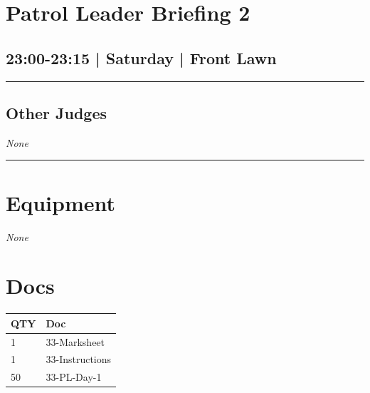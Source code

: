 \documentclass[10pt, A5]{article}
\begin{document}
        \begin{framed}
        \begin{minipage}{\textwidth}

        \setcounter{section}{52}
        \section{Patrol Leader Briefing 2}
        \subsection*{23:00-23:15 | Saturday | Front Lawn}

        \vspace{0.25cm}
        \hrule
        \vspace{0.25cm}


        \subsection*{Other Judges}
                \textit{None}

            \vspace{0.25cm}
        \hrule
        \vspace{0.25cm}

        \begin{multicols}{2}

		\section*{\faWrench \: Equipment}

				\textit{None}
		
		\vfill\null
		\columnbreak

			\section*{\faFile \: Docs}
		 	\begin{center}
			\begin{tabular}{p{2cm}p{4cm}}

			\textbf{QTY} & \textbf{Doc} \\\toprule
										1&33-Marksheet\\\midrule
										1&33-Instructions\\\midrule
										50&33-PL-Day-1\\\midrule
							\end{tabular}
			\end{center}
	

		\vfill\null

		\end{multicols}
\end{minipage}
\end{framed}
\end{document}
